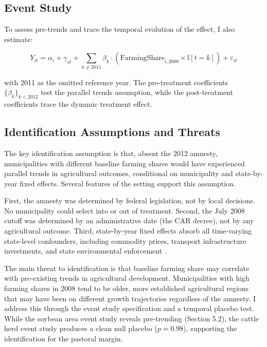 \documentclass[12pt]{article}
\newcommand{\ind}{\mathbb{I}}
\begin{document}
\subsection{Event Study}

To assess pre-trends and trace the temporal evolution of the effect, I also estimate:

\begin{equation}
Y_{it} = \alpha_i + \gamma_{st} + \sum_{k \neq 2011} \beta_k \cdot (\text{FarmingShare}_{i,2008} \times \ind[t = k]) + \varepsilon_{it}
\label{eq:eventstudy}
\end{equation}

\noindent with 2011 as the omitted reference year. The pre-treatment coefficients $\{\beta_k\}_{k<2012}$ test the parallel trends assumption, while the post-treatment coefficients trace the dynamic treatment effect.

\subsection{Identification Assumptions and Threats}

The key identification assumption is that, absent the 2012 amnesty, municipalities with different baseline farming shares would have experienced parallel trends in agricultural outcomes, conditional on municipality and state-by-year fixed effects. Several features of the setting support this assumption.

First, the amnesty was determined by federal legislation, not by local decisions. No municipality could select into or out of treatment. Second, the July 2008 cutoff was determined by an administrative date (the CAR decree), not by any agricultural outcome. Third, state-by-year fixed effects absorb all time-varying state-level confounders, including commodity prices, transport infrastructure investments, and state environmental enforcement \citep{assuncao2015deterring}.

The main threat to identification is that baseline farming share may correlate with pre-existing trends in agricultural development. Municipalities with high farming shares in 2008 tend to be older, more established agricultural regions that may have been on different growth trajectories regardless of the amnesty. I address this through the event study specification and a temporal placebo test. While the soybean area event study reveals pre-trending (Section 5.2), the cattle herd event study produces a clean null placebo ($p = 0.98$), supporting the identification for the pastoral margin.
\end{document}

